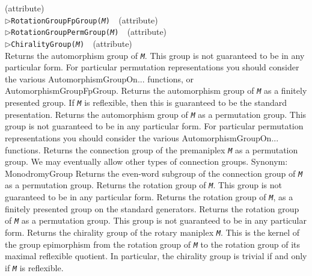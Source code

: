\documentclass[a4paper,11pt]{report}
\begin{document}
{{{{{\label{RotationGroup:for IsManiplex}
}\hfill{\scriptsize (attribute)}}\\
\noindent\textcolor{FuncColor}{$\triangleright$\enspace\texttt{RotationGroupFpGroup({\mdseries\slshape M})
\label{RotationGroupFpGroup:for IsManiplex}
}\hfill{\scriptsize (attribute)}}\\
\noindent\textcolor{FuncColor}{$\triangleright$\enspace\texttt{RotationGroupPermGroup({\mdseries\slshape M})
\label{RotationGroupPermGroup:for IsManiplex}
}\hfill{\scriptsize (attribute)}}\\
\noindent\textcolor{FuncColor}{$\triangleright$\enspace\texttt{ChiralityGroup({\mdseries\slshape M})
\label{ChiralityGroup:for IsRotaryManiplex}
}\hfill{\scriptsize (attribute)}}\\


 Returns the automorphism group of \mbox{\texttt{\mdseries\slshape M}}. This group is not guaranteed to be in any particular form. For particular
permutation representations you should consider the various
AutomorphismGroupOn... functions, or AutomorphismGroupFpGroup. Returns the
automorphism group of \mbox{\texttt{\mdseries\slshape M}} as a finitely presented group. If \mbox{\texttt{\mdseries\slshape M}} is reflexible, then this is guaranteed to be the standard presentation.
Returns the automorphism group of \mbox{\texttt{\mdseries\slshape M}} as a permutation group. This group is not guaranteed to be in any particular
form. For particular permutation representations you should consider the
various AutomorphismGroupOn... functions. Returns the connection group of the
premaniplex \mbox{\texttt{\mdseries\slshape M}} as a permutation group. We may eventually allow other types of connection
groups. Synonym: MonodromyGroup Returns the even-word subgroup of the
connection group of \mbox{\texttt{\mdseries\slshape M}} as a permutation group. Returns the rotation group of \mbox{\texttt{\mdseries\slshape M}}. This group is not guaranteed to be in any particular form. Returns the
rotation group of \mbox{\texttt{\mdseries\slshape M}}, as a finitely presented group on the standard generators. Returns the
rotation group of \mbox{\texttt{\mdseries\slshape M}} as a permutation group. This group is not guaranteed to be in any particular
form. Returns the chirality group of the rotary maniplex \mbox{\texttt{\mdseries\slshape M}}. This is the kernel of the group epimorphism from the rotation group of \mbox{\texttt{\mdseries\slshape M}} to the rotation group of its maximal reflexible quotient. In particular, the
chirality group is trivial if and only if \mbox{\texttt{\mdseries\slshape M}} is reflexible. }

}}
\end{document}
